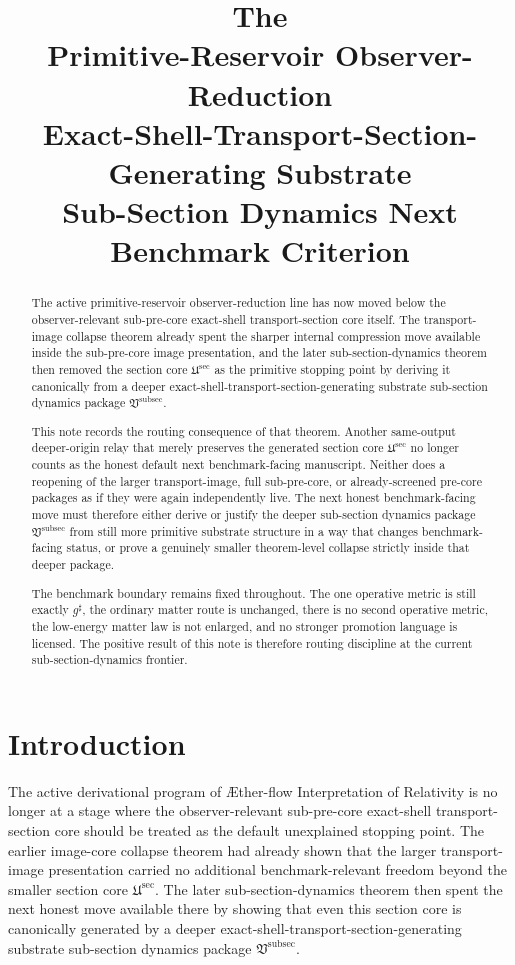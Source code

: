 \documentclass[11pt]{article}
\title{\textbf{The \TheoryName{}}\\[0.4em]
\large Primitive-Reservoir Observer-Reduction\\
\large Exact-Shell-Transport-Section-Generating Substrate\\
\large Sub-Section Dynamics Next Benchmark Criterion}
\author{}
\date{}
\newcommand{\Aflow}{\AE{}ther-flow}
\newcommand{\TheoryName}{\Aflow{} Interpretation of Relativity}
\newcommand{\CompletedMetric}{g^{\sharp}}
\newcommand{\SubPreSectionCore}{\mathfrak U^{\mathrm{sec}}}
\newcommand{\SubSectionPackage}{\mathfrak V^{\mathrm{subsec}}}
\begin{document}
\maketitle

\begin{abstract}
The active primitive-reservoir observer-reduction line has now moved below the observer-relevant sub-pre-core exact-shell transport-section core itself. The transport-image collapse theorem already spent the sharper internal compression move available inside the sub-pre-core image presentation, and the later sub-section-dynamics theorem then removed the section core \(\SubPreSectionCore\) as the primitive stopping point by deriving it canonically from a deeper exact-shell-transport-section-generating substrate sub-section dynamics package \(\SubSectionPackage\).

This note records the routing consequence of that theorem. Another same-output deeper-origin relay that merely preserves the generated section core \(\SubPreSectionCore\) no longer counts as the honest default next benchmark-facing manuscript. Neither does a reopening of the larger transport-image, full sub-pre-core, or already-screened pre-core packages as if they were again independently live. The next honest benchmark-facing move must therefore either derive or justify the deeper sub-section dynamics package \(\SubSectionPackage\) from still more primitive substrate structure in a way that changes benchmark-facing status, or prove a genuinely smaller theorem-level collapse strictly inside that deeper package.

The benchmark boundary remains fixed throughout. The one operative metric is still exactly \(\CompletedMetric\), the ordinary matter route is unchanged, there is no second operative metric, the low-energy matter law is not enlarged, and no stronger promotion language is licensed. The positive result of this note is therefore routing discipline at the current sub-section-dynamics frontier.
\end{abstract}

\section{Introduction}

The active derivational program of \TheoryName{} is no longer at a stage where the observer-relevant sub-pre-core exact-shell transport-section core should be treated as the default unexplained stopping point. The earlier image-core collapse theorem had already shown that the larger transport-image presentation carried no additional benchmark-relevant freedom beyond the smaller section core \(\SubPreSectionCore\). The later sub-section-dynamics theorem then spent the next honest move available there by showing that even this section core is canonically generated by a deeper exact-shell-transport-section-generating substrate sub-section dynamics package \(\SubSectionPackage\).
\end{document}

